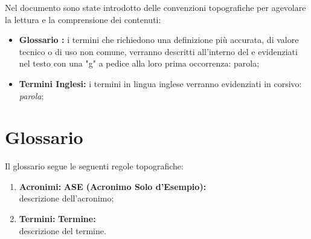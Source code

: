 \documentclass[11pt]{book}              %
\begin{document}
Nel documento sono state introdotto delle convenzioni topografiche per agevolare la lettura e la comprensione dei contenuti:

\begin{itemize}
	\item \textbf{Glossario :}  i termini che richiedono una definizione più accurata, di valore tecnico o di uso non comune, verranno descritti all'interno del  e evidenziati nel testo con una "g" a pedice alla loro prima occorrenza: parola;
	\item \textbf{Termini Inglesi:} i termini in lingua inglese verranno evidenziati in corsivo: \textit{parola};


\end{itemize}
\newpage
\thispagestyle{empty}

\tableofcontents    

\listoffigures

\listoftables

\newpage
\thispagestyle{empty}

\cfoot{}
\renewcommand{\footrulewidth}{0.2pt}
\newcommand{\numref}[1]{\textsl{\nameref{#1} (\ref{#1})}}                
\mainmatter       
  










\newpage

\chapter{Glossario}
\label{Glossario}

Il glossario segue le seguenti regole topografiche:
\begin{enumerate}


	\item \textbf{Acronimi:} \textbf{{\color{OliveGreen}ASE }(Acronimo Solo d'Esempio):}\\ descrizione dell'acronimo;
	\item \textbf{Termini:} \textbf{{\color{Plum}Termine}:} \\
	descrizione del termine.

\end{enumerate}
\end{document}
